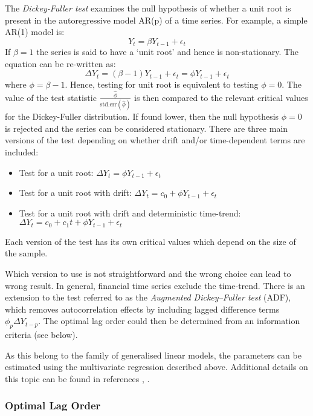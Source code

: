 \documentclass[11pt]{article}
\providecommand{\tightlist}{%
      \setlength{\itemsep}{0pt}\setlength{\parskip}{0pt}}
\begin{document}
\begin{appendices}
The \emph{Dickey-Fuller test} examines the null hypothesis of whether a
unit root is present in the autoregressive model AR(p) of a time series. For example, a simple AR(1) model is:
\begin{equation}
Y_t = \beta Y_{t-1} + \epsilon_t
\end{equation}
If \(\beta=1\) the series is said to have a `unit root' and hence is
non-stationary. The equation can be re-written as:
\begin{equation}
\Delta Y_t = (\beta - 1) Y_{t-1} + \epsilon_t = \phi Y_{t-1} + \epsilon_t
\end{equation}
where \(\phi= \beta-1\). Hence, testing for unit root is equivalent to
testing \(\phi=0\).
The value of the test statistic $\frac{\hat{\phi}}{\text{std.err}(\hat{\phi})}$ is
then compared to the relevant critical values for the Dickey-Fuller
distribution. If found lower, then the null hypothesis \(\phi=0\) is
rejected and the series can be considered stationary.
There are three main versions of the test depending on whether drift and/or
time-dependent terms are included:
\begin{itemize}
\tightlist
\item
  Test for a unit root: \(\Delta Y_t = \phi Y_{t-1} + \epsilon_t\)
\item
  Test for a unit root with drift:
  \(\Delta Y_t = c_0 + \phi Y_{t-1} + \epsilon_t\)
\item
  Test for a unit root with drift and deterministic time-trend:
  \(\Delta Y_t = c_0 + c_1 t + \phi Y_{t-1} + \epsilon_t\)
\end{itemize}
Each version of the test has its own critical values which depend on
the size of the sample. 

Which version to use is not straightforward and
the wrong choice can lead to wrong result. In general, financial
time series exclude the time-trend.
There is an extension to the test referred to as the {\em Augmented
Dickey--Fuller test} (ADF), which removes autocorrelation effects by
including lagged difference terms \(\phi_p \Delta Y_{t-p}\). The optimal
lag order could then be determined from an  information criteria (see
below).

As this belong to the family of generalised linear
models,  the parameters can be estimated using the 
multivariate regression described above.
Additional details on this topic can be found in references \cite{wikiADF}, \cite{wikiDF}.

    \subsubsection{Optimal Lag Order}\label{optimal-lag-order}
    

\end{appendices}
\end{document}
